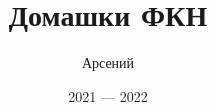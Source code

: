 \documentclass[12pt]{article}
\begin{document}
	\makeFit

	\title{Домашки ФКН}
	\author{Арсений}
	\date{2021 --- 2022}
	
	\maketitle
	\tableofcontents

	\newpage
	
\end{document}
